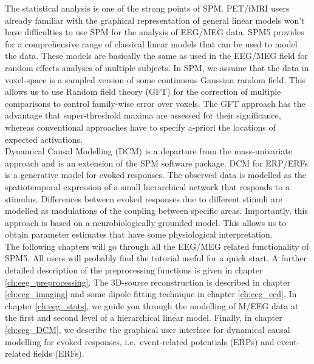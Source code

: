 The statistical analysis is one of the strong points of SPM. PET/fMRI
users already familiar with the graphical representation of
general linear models won't have difficulties to use SPM for the
analysis of EEG/MEG data. SPM5 provides for a comprehensive range of
classical linear models that can be used to model the data. These
models are basically the same as used in the EEG/MEG field
for random effects analyses of multiple subjects. In SPM, we assume
that the data in voxel-space is a sampled version of some continuous Gaussian
random field. This allows us to use Random field theory (GFT)
for the correction of multiple comparisons to control family-wise
error over voxels. The GFT approach has the advantage that
super-threshold maxima are assessed for their significance, whereas
conventional approaches have to specify a-priori the locations of
expected activations.
\\

Dynamical Causal Modelling (DCM) is a departure from the mass-univariate
approach and is an extension of the SPM software package. DCM for ERP/ERFs is a
generative model for evoked responses. The observed data is modelled
as the spatiotemporal expression of a small hierarchical network that
responds to a stimulus. Differences between evoked responses due to different
stimuli are modelled as modulations of the coupling between specific
areas. Importantly, this approach is based on a neurobiologically
grounded model. This allows us to obtain parameter estimates that have
some physiological interpretation.
\\

The following chapters will go through all the EEG/MEG related
functionality of SPM5. All users will probably find the tutorial
useful for a quick start. A further detailed description of the
preprocessing functions is given in chapter
\ref{ch:eeg_preprocessing}. The 3D-source reconstruction is described
in chapter \ref{ch:eeg_imaging} and some dipole fitting technique in
chapter \ref{ch:eeg_ecd}. In chapter \ref{ch:eeg_stats}, we
guide you through the modelling of M/EEG data at the first and second
level of a hierarchical linear model. Finally, in chapter
\ref{ch:eeg_DCM}, we describe the graphical user interface for
dynamical causal modelling for evoked 
responses, i.e.~event-related potentials (ERPs) and event-related
fields (ERFs).

